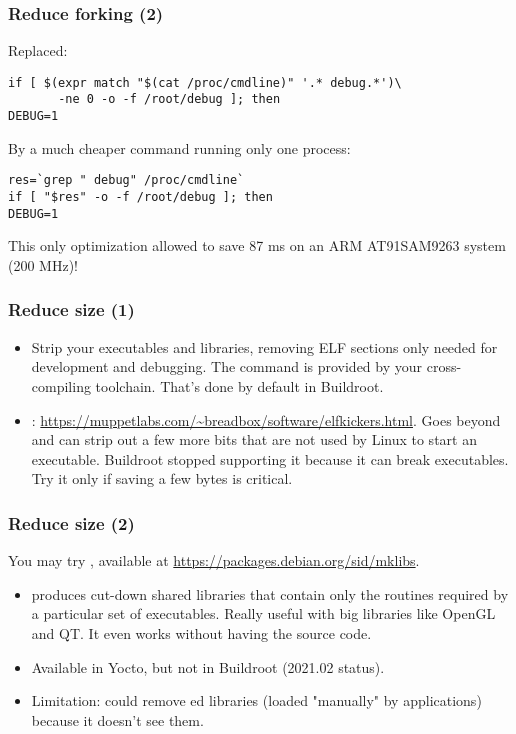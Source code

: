 \begin{frame}[fragile]
\frametitle{Reduce forking (2)}
Replaced:
\begin{block}{}
\begin{verbatim}
if [ $(expr match "$(cat /proc/cmdline)" '.* debug.*')\
       -ne 0 -o -f /root/debug ]; then
DEBUG=1
\end{verbatim}
\end{block}
By a much cheaper command running only one process:
\begin{block}{}
\begin{verbatim}
res=`grep " debug" /proc/cmdline`
if [ "$res" -o -f /root/debug ]; then
DEBUG=1
\end{verbatim}
\end{block}
This only optimization allowed to save 87 ms on an ARM AT91SAM9263
system (200 MHz)!
\end{frame}


\begin{frame}
\frametitle{Reduce size (1)}
\begin{itemize}
	\item Strip your executables and libraries, removing ELF sections
		only needed for development and debugging. The 
		command is provided by your cross-compiling toolchain.
		That's done by default in Buildroot.
	\item {}:
		\url{https://muppetlabs.com/~breadbox/software/elfkickers.html}.
		Goes beyond  and can strip out a few more bits
		that are not used by Linux to start an executable.
		Buildroot stopped supporting it because it can break
	        executables. Try it only if saving a few bytes is
		critical.
\end{itemize}
\end{frame}

\begin{frame}
\frametitle{Reduce size (2)}
You may try , available at \url{https://packages.debian.org/sid/mklibs}.
\begin{itemize}
	\item {} produces cut-down shared libraries that contain
	only the routines required by a particular set of executables.
	Really useful with big libraries like OpenGL and QT. It even
	works without having the source code.
	\item Available in Yocto, but not in Buildroot (2021.02 status).
        \item Limitation: \code{mklibs} could remove \code{dlopen}ed libraries
        (loaded "manually" by applications) because it doesn't see them.
\end{itemize}
\end{frame}

